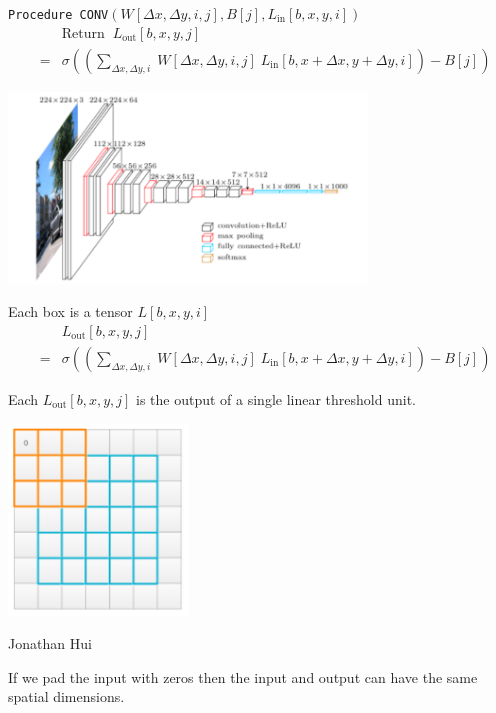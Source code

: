 {\vfill
{\tt Procedure CONV}$(W[\Delta x, \Delta y, i, j], B[j], L_{\mathrm{in}}[b,x,y,i])$
\begin{eqnarray*}
 & &  \mbox{Return}\;\;L_{\mathrm{out}}[b,x,y,j] \\
 & = &   \sigma\left(\left(\sum_{\Delta x, \Delta y, i}\;W[\Delta x, \Delta y, i,j]\; L_{\mathrm{in}}[b,x + \Delta x, y + \Delta y, i]\right) - B[j]\right)
\end{eqnarray*}

\centerline{\includegraphics[height = 2.0in]{../images/VGG}}

Each box is a tensor $L[b,x,y,i]$
\begin{eqnarray*}
 & &  L_{\mathrm{out}}[b,x,y,j] \\
 & = & \sigma\left(\left(\sum_{\Delta x, \Delta y, i}\;W[\Delta x, \Delta y, i,j]\; L_{\mathrm{in}}[b,x + \Delta x, y + \Delta y, i]\right) - B[j]\right)
\end{eqnarray*}

\vfill
Each $L_{\mathrm{out}}[b,x,y,j]$ is the output of a single linear threshold unit.


\centerline{\includegraphics[height = 2.0in]{../images/padding2}}
\centerline{\large Jonathan Hui}

\vfill
If we pad the input with zeros then the input and output can have the same spatial dimensions.


}
